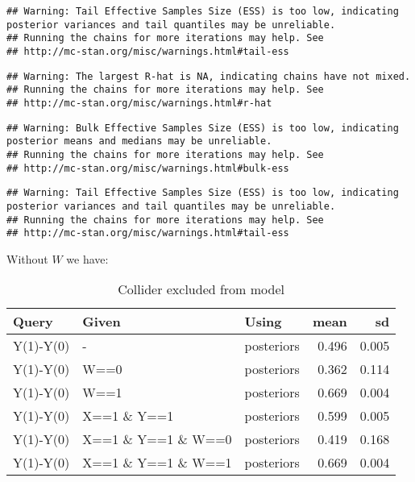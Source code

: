 \documentclass[
  12pt,
]{book}
\begin{document}
\begin{verbatim}
## Warning: Tail Effective Samples Size (ESS) is too low, indicating posterior variances and tail quantiles may be unreliable.
## Running the chains for more iterations may help. See
## http://mc-stan.org/misc/warnings.html#tail-ess
\end{verbatim}

\begin{verbatim}
## Warning: The largest R-hat is NA, indicating chains have not mixed.
## Running the chains for more iterations may help. See
## http://mc-stan.org/misc/warnings.html#r-hat
\end{verbatim}

\begin{verbatim}
## Warning: Bulk Effective Samples Size (ESS) is too low, indicating posterior means and medians may be unreliable.
## Running the chains for more iterations may help. See
## http://mc-stan.org/misc/warnings.html#bulk-ess
\end{verbatim}

\begin{verbatim}
## Warning: Tail Effective Samples Size (ESS) is too low, indicating posterior variances and tail quantiles may be unreliable.
## Running the chains for more iterations may help. See
## http://mc-stan.org/misc/warnings.html#tail-ess
\end{verbatim}

Without \(W\) we have:

\begin{table}

\caption{\label{tab:applearncoll6}Collider excluded from model}
\centering
\begin{tabular}[t]{l|l|l|r|r}
\hline
Query & Given & Using & mean & sd\\
\hline
Y(1)-Y(0) & - & posteriors & 0.496 & 0.005\\
\hline
Y(1)-Y(0) & W==0 & posteriors & 0.362 & 0.114\\
\hline
Y(1)-Y(0) & W==1 & posteriors & 0.669 & 0.004\\
\hline
Y(1)-Y(0) & X==1 \& Y==1 & posteriors & 0.599 & 0.005\\
\hline
Y(1)-Y(0) & X==1 \& Y==1 \& W==0 & posteriors & 0.419 & 0.168\\
\hline
Y(1)-Y(0) & X==1 \& Y==1 \& W==1 & posteriors & 0.669 & 0.004\\
\hline
\end{tabular}
\end{table}
\end{document}

